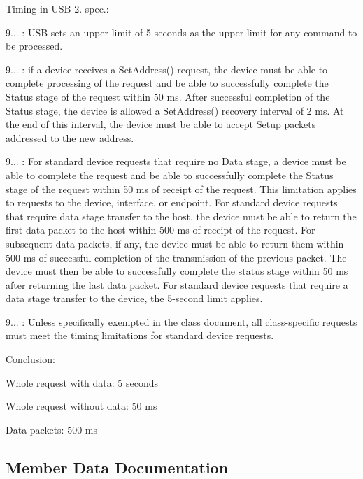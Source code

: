 Timing in U\+SB 2. spec.\+:
\begin{DoxyItemize}
\item 9... \+: U\+SB sets an upper limit of 5 seconds as the upper limit for any command to be processed.
\item 9... \+: if a device receives a Set\+Address() request, the device must be able to complete processing of the request and be able to successfully complete the Status stage of the request within 50 ms. After successful completion of the Status stage, the device is allowed a Set\+Address() recovery interval of 2 ms. At the end of this interval, the device must be able to accept Setup packets addressed to the new address.
\item 9... \+: For standard device requests that require no Data stage, a device must be able to complete the request and be able to successfully complete the Status stage of the request within 50 ms of receipt of the request. This limitation applies to requests to the device, interface, or endpoint. For standard device requests that require data stage transfer to the host, the device must be able to return the first data packet to the host within 500 ms of receipt of the request. For subsequent data packets, if any, the device must be able to return them within 500 ms of successful completion of the transmission of the previous packet. The device must then be able to successfully complete the status stage within 50 ms after returning the last data packet. For standard device requests that require a data stage transfer to the device, the 5-\/second limit applies.
\item 9... \+: Unless specifically exempted in the class document, all class-\/specific requests must meet the timing limitations for standard device requests.
\end{DoxyItemize}

Conclusion\+:
\begin{DoxyEnumerate}
\item Whole request with data\+: 5 seconds
\item Whole request without data\+: 50 ms
\item Data packets\+: 500 ms 
\end{DoxyEnumerate}

\subsection{Member Data Documentation}
\mbox{\label{structusb__h__ctrl__xfer_ac1431c769926b00cf8ddfc60c7758271}} 
